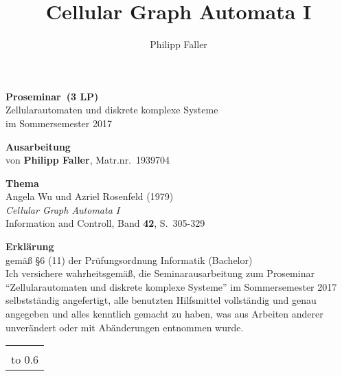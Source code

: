 \documentclass[11pt]{article}
\author{Philipp Faller}
\title{Cellular Graph Automata I}
\newcommand{\teilnehmername}{Philipp Faller} %
\newcommand{\teilnehmermatrnr}{1939704}        %
\newcommand{\seminarart}{Proseminar}           %
\newcommand{\seminarlp}{3 LP}                  %
\newcommand{\seminarjahr}{2017}                %
\begin{document}
{\thispagestyle{empty}\large\sffamily\raggedright
%
%
\unskip %
\noindent \textbf{\Large \seminarart\ (\seminarlp)} 
\\[\baselineskip]
%
Zellularautomaten und diskrete komplexe Systeme
\\[1ex]
%
im Sommersemester \seminarjahr

\vspace*{3\baselineskip}

\noindent \textbf{\Large Ausarbeitung} \\[\baselineskip]
%
von \textbf{\teilnehmername}, Matr.nr.~\teilnehmermatrnr

\vspace*{3\baselineskip}

\noindent \textbf{\Large Thema} \\[\baselineskip]
%
%
Angela Wu und Azriel Rosenfeld (1979)\\[1ex]
%
\textit{Cellular Graph Automata I }\\[1ex]
%
Information and Controll, Band \textbf{42}, S.~305-329
}
\clearpage
{\thispagestyle{empty}\raggedright

\noindent \textbf{\Large Erklärung}\\[1ex]
gemäß \S 6 (11) der Prüfungsordnung Informatik %
(Bachelor) %
\\[\baselineskip]

\noindent
Ich versichere wahrheitsgemäß, die Seminarausarbeitung zum
\seminarart{} "`Zellularautomaten und diskrete komplexe Systeme"' im
Sommersemester \seminarjahr{} selbstständig angefertigt, alle
benutzten Hilfsmittel vollständig und genau angegeben und alles
kenntlich gemacht zu haben, was aus Arbeiten anderer unverändert oder
mit Abänderungen entnommen wurde.

\vspace*{30mm}
\noindent
\begin{tabular}{@{}l}
  \hline
   \\[-1ex]
  \hbox to 0.6\textwidth{(\teilnehmername, Matr.nr.~\teilnehmermatrnr) \hss}
\end{tabular}
}
\end{document}
